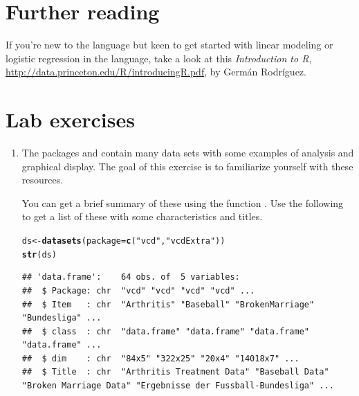 \documentclass[11pt]{book}\usepackage[]{graphicx}\usepackage[]{color}
\makeatletter
\newcommand{\hlstr}[1]{\textcolor[rgb]{0.192,0.494,0.8}{#1}}%
\newcommand{\hlstd}[1]{\textcolor[rgb]{0.345,0.345,0.345}{#1}}%
\newcommand{\hlkwb}[1]{\textcolor[rgb]{0.69,0.353,0.396}{#1}}%
\newcommand{\hlkwc}[1]{\textcolor[rgb]{0.333,0.667,0.333}{#1}}%
\newcommand{\hlkwd}[1]{\textcolor[rgb]{0.737,0.353,0.396}{\textbf{#1}}}%
\newenvironment{kframe}{%
 \def\at@end@of@kframe{}%
 \ifinner\ifhmode%
  \def\at@end@of@kframe{\end{minipage}}%
  \begin{minipage}{\columnwidth}%
 \fi\fi%
 \def\FrameCommand##1{\hskip\@totalleftmargin \hskip-\fboxsep
 \colorbox{shadecolor}{##1}\hskip-\fboxsep
     \hskip-\linewidth \hskip-\@totalleftmargin \hskip\columnwidth}%
 \MakeFramed {\advance\hsize-\width
   \@totalleftmargin\z@ \linewidth\hsize
   \@setminipage}}%
 {\par\unskip\endMakeFramed%
 \at@end@of@kframe}
\newenvironment{knitrout}{}{} %
\renewenvironment{knitrout}{\small\renewcommand{\baselinestretch}{.85}}{} %
\makeatother
\begin{document}
\section{Further reading}\label{sec:ch02-reading}

If you're new to the \R language but keen to get started with linear modeling or logistic regression in the language, take a look at this \emph{Introduction to R},
\url{http://data.princeton.edu/R/introducingR.pdf},
by Germ\'an Rodríguez.

\section{Lab exercises}\label{sec:ch02-exercises}

\begin{enumerate}

\item The packages  and  contain many data sets with some
examples of analysis and graphical display.  The goal of this exercise is to
familiarize yourself with these resources.

You can get a brief summary of
these using the function .  Use the following to get a list of
these with some characteristics and titles.
\begin{knitrout}\footnotesize
{}\color{fgcolor}\begin{kframe}
\begin{alltt}
\hlstd{ds} \hlkwb{<-} \hlkwd{datasets}\hlstd{(}\hlkwc{package}\hlstd{=}\hlkwd{c}\hlstd{(}\hlstr{"vcd"}\hlstd{,} \hlstr{"vcdExtra"}\hlstd{))}
\hlkwd{str}\hlstd{(ds)}
\end{alltt}
\begin{verbatim}
## 'data.frame':	64 obs. of  5 variables:
##  $ Package: chr  "vcd" "vcd" "vcd" "vcd" ...
##  $ Item   : chr  "Arthritis" "Baseball" "BrokenMarriage" "Bundesliga" ...
##  $ class  : chr  "data.frame" "data.frame" "data.frame" "data.frame" ...
##  $ dim    : chr  "84x5" "322x25" "20x4" "14018x7" ...
##  $ Title  : chr  "Arthritis Treatment Data" "Baseball Data" "Broken Marriage Data" "Ergebnisse der Fussball-Bundesliga" ...
\end{verbatim}
\end{kframe}
\end{knitrout}



\end{enumerate}
\end{document}
